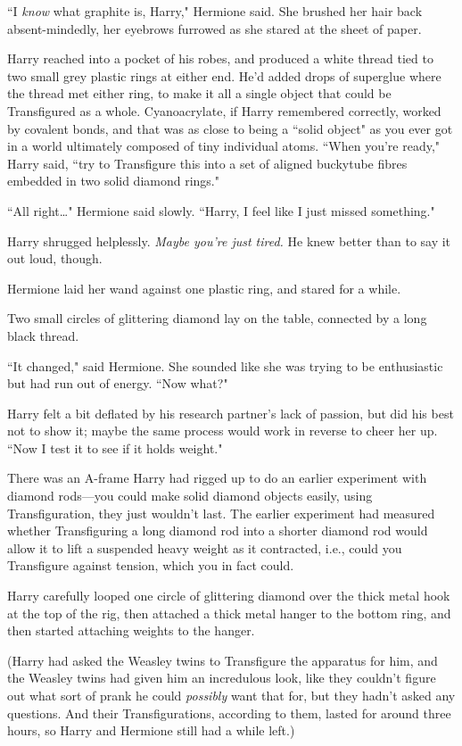 ``I \emph{know} what graphite is, Harry," Hermione said. She brushed her hair back absent-mindedly, her eyebrows furrowed as she stared at the sheet of paper.

Harry reached into a pocket of his robes, and produced a white thread tied to two small grey plastic rings at either end. He'd added drops of superglue where the thread met either ring, to make it all a single object that could be Transfigured as a whole. Cyanoacrylate, if Harry remembered correctly, worked by covalent bonds, and that was as close to being a ``solid object" as you ever got in a world ultimately composed of tiny individual atoms. ``When you're ready," Harry said, ``try to Transfigure this into a set of aligned buckytube fibres embedded in two solid diamond rings."

``All right{\ldots}" Hermione said slowly. ``Harry, I feel like I just missed something."

Harry shrugged helplessly. \emph{Maybe you're just tired.} He knew better than to say it out loud, though.

Hermione laid her wand against one plastic ring, and stared for a while.

Two small circles of glittering diamond lay on the table, connected by a long black thread.

``It changed," said Hermione. She sounded like she was trying to be enthusiastic but had run out of energy. ``Now what?"

Harry felt a bit deflated by his research partner's lack of passion, but did his best not to show it; maybe the same process would work in reverse to cheer her up. ``Now I test it to see if it holds weight."

There was an A-frame Harry had rigged up to do an earlier experiment with diamond rods—you could make solid diamond objects easily, using Transfiguration, they just wouldn't last. The earlier experiment had measured whether Transfiguring a long diamond rod into a shorter diamond rod would allow it to lift a suspended heavy weight as it contracted, i.e., could you Transfigure against tension, which you in fact could.

Harry carefully looped one circle of glittering diamond over the thick metal hook at the top of the rig, then attached a thick metal hanger to the bottom ring, and then started attaching weights to the hanger.

(Harry had asked the Weasley twins to Transfigure the apparatus for him, and the Weasley twins had given him an incredulous look, like they couldn't figure out what sort of prank he could \emph{possibly} want that for, but they hadn't asked any questions. And their Transfigurations, according to them, lasted for around three hours, so Harry and Hermione still had a while left.)

